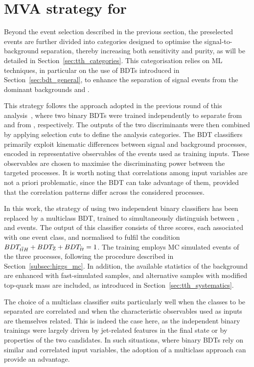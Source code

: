 \section{MVA strategy for \ttHtt}
\label{sec:tth_mva}

Beyond the event selection described in the previous section, the preselected \ttHtt events are further divided into categories designed to optimise the signal-to-background separation, thereby increasing both sensitivity and purity, as will be detailed in Section~\ref{sec:tth_categories}. This categorisation relies on ML techniques, in particular on the use of BDTs introduced in Section~\ref{sec:bdt_general}, to enhance the separation of \ttH signal events from the dominant backgrounds \ztautau and \ttbar.

This strategy follows the approach adopted in the previous round of this \htautau analysis~\cite{couplings}, where two binary BDTs were trained independently to separate \ttH from \ztautau and \ttH from \ttbar, respectively. The outputs of the two discriminants were then combined by applying selection cuts to define the analysis categories. 
The BDT classifiers primarily exploit kinematic differences between signal and background processes, encoded in representative observables of the events used as training inputs. These observables are chosen to maximise the discriminating power between the targeted processes. 
It is worth noting that correlations among input variables are not a priori problematic, since the BDT can take advantage of them, provided that the correlation patterns differ across the considered processes.

In this work, the strategy of using two independent binary classifiers has been replaced by a multiclass BDT, trained to simultaneously distinguish between \ttH, \ztautau and \ttbar events. The output of this classifier consists of three scores, each associated with one event class, and normalised to fulfil the condition $BDT_{\text{\ensuremath{t\overline{t}H}}} + BDT_{\text{Z}} + BDT_{\text{$\bar{t}t$}} = 1$.
The training employs MC simulated events of the three processes, following the procedure described in Section~\ref{subsec:higgs_mc}. In addition, the available statistics of the \ttbar background are enhanced with fast-simulated samples, and alternative samples with modified top-quark mass are included, as introduced in Section~\ref{sec:tth_systematics}.

The choice of a multiclass classifier suits particularly well when the classes to be separated are correlated and when the characteristic observables used as inputs are themselves related. This is indeed the case here, as the independent binary trainings were largely driven by jet-related features in the final state or by properties of the two \tauhadvis candidates. In such situations, where binary BDTs rely on similar and correlated input variables, the adoption of a multiclass approach can provide an advantage.

